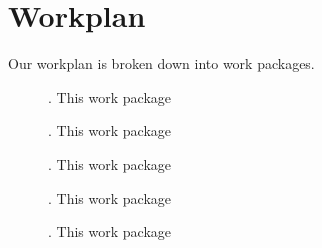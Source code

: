 \section{Workplan}
Our workplan is broken down into  work packages.
\begin{description}
	\item[\WPAdminDiss]{\bf\WPAdminDissName}. This work package
	\item[\WPCrypto]{\bf\WPCryptoName}. This work package
	\item[\WPTools]{\bf\WPToolsName}. This work package
\ifulster
	\item[\WPCloud]{\bf\WPCloudName}. This work package
\fi
	\item[\WPUser]{\bf\WPUserName}. This work package
\end{description}
